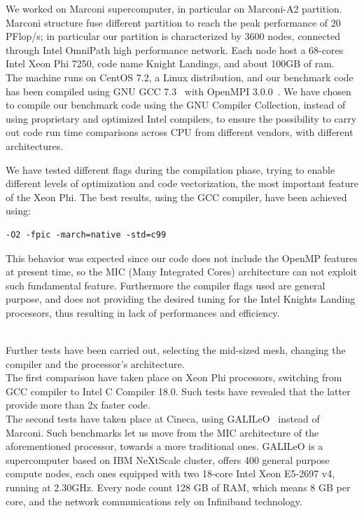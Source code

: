 We worked on Marconi\cite{marconi:specs} supercomputer, in particular on Marconi-A2 partition.
Marconi structure fuse different partition to reach the peak performance of 20 PFlop/s; in particular our partition is characterized by 3600 nodes, connected through Intel OmniPath\cite{intel:intelmpivsopenmpi} high performance network. Each node host a 68-cores Intel Xeon Phi 7250, code name Knight Landings, and about 100GB of ram. \\
The machine runs on CentOS 7.2, a Linux distribution, and our benchmark code has been compiled using GNU GCC 7.3~\cite{gcc} with OpenMPI 3.0.0~\cite{openmpi}\cite{MPI:standard3}. We have chosen to compile our benchmark code using the GNU Compiler Collection, instead of using proprietary and optimized Intel compilers, to ensure the possibility to carry out code run time comparisons across CPU from different vendors, with different architectures. 
\par
We have tested different flags during the compilation phase, trying to enable different levels of optimization and code vectorization, the most important feature of the Xeon Phi. The best results, using the GCC compiler, have been achieved using:
\begin{lstlisting}
-O2 -fpic -march=native -std=c99
\end{lstlisting}
This behavior was expected since our code does not include the OpenMP\cite{openmp} features at present time, so the MIC\cite{mic} (Many Integrated Cores) architecture can not exploit such fundamental feature. Furthermore the compiler flags used are general purpose, and does not providing the desired tuning for the Intel Knights Landing processors, thus resulting in lack of performances and efficiency.\\~\par

Further tests have been carried out, selecting the mid-sized mesh, changing the compiler and the processor's architecture.\\
The first comparison have taken place on Xeon Phi processors, switching from GCC compiler to Intel C Compiler 18.0. Such tests have revealed that the latter provide more than 2x faster code. \\
The second tests have taken place at Cineca, using GALILeO~\cite{galileo:specs} instead of Marconi. Such benchmarks let us move from the MIC architecture of the aforementioned processor, towards a more traditional ones.
GALILeO is a supercomputer based on IBM NeXtScale cluster, offers 400 general purpose compute nodes, each ones equipped with two 18-core Intel Xeon E5-2697 v4, running at 2.30GHz. Every node count 128 GB of RAM, which means 8 GB per core, and the network communications rely on Infiniband technology.

